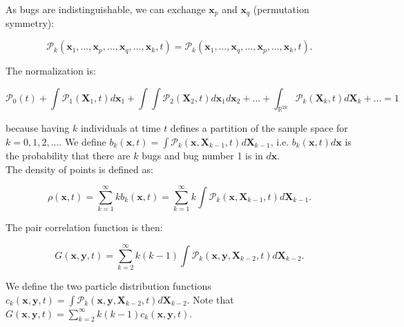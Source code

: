 As bugs are indistinguishable, we can exchange $\boldsymbol{x}_{p}$
and $\boldsymbol{x}_{q}$ (permutation symmetry):

\begin{equation}
\mathcal{P}_{k}(\boldsymbol{x}_{1},\ldots,\boldsymbol{x}_{p},\ldots,\boldsymbol{x}_{q},\ldots,\boldsymbol{x}_{k},t)=\mathcal{P}_{k}(\boldsymbol{x}_{1},\ldots,\boldsymbol{x}_{q},\ldots,\boldsymbol{x}_{p},\ldots,\boldsymbol{x}_{k},t).
\end{equation}

\vspace{1.25em}

The normalization is: 

\begin{equation}
\mathcal{P}_{0}(t)+\int\mathcal{P}_{1}(\boldsymbol{X}_{1},t)d\boldsymbol{x}_{1}+\int\int\mathcal{P}_{2}(\boldsymbol{X}_{2},t)d\boldsymbol{x}_{1}d\boldsymbol{x}_{2}+\ldots+\int_{\mathbb{R}^{2k}}\mathcal{P}_{k}(\boldsymbol{X}_{k},t)d\boldsymbol{X}_{k}+\ldots=1
\end{equation}

\vspace{1.25em}
because having $k$ individuals at time $t$ defines a partition of the sample space for $k=0,1,2,...$. 
We define $b_{k}(\boldsymbol{x},t)=\int\mathcal{P}_{k}(\boldsymbol{x},\boldsymbol{X}_{k-1},t)d\boldsymbol{X}_{k-1}$, i.e. $b_{k}(\boldsymbol{x},t)d\boldsymbol{x}$ is 
the probability that there are $k$ bugs and bug number 1 is in $d\boldsymbol{x}$.\\

The density of points is defined as:

\begin{equation}
\rho(\boldsymbol{x},t)=\sum_{k=1}^{\infty}kb_{k}(\boldsymbol{x},t)=\sum_{k=1}^{\infty}k\int\mathcal{P}_{k}(\boldsymbol{x},\boldsymbol{X}_{k-1},t)d\boldsymbol{X}_{k-1}.
\end{equation}

The pair correlation function is then:

\begin{equation}
G(\boldsymbol{x},\boldsymbol{y},t)=\sum_{k=2}^{\infty}k(k-1)\int\mathcal{P}_{k}(\boldsymbol{x},\boldsymbol{y},\boldsymbol{X}_{k-2},t)d\boldsymbol{X}_{k-2}. \label{eq:def_pairdens}
\end{equation}

We define the two particle distribution functions $c_{k}(\boldsymbol{x},\boldsymbol{y},t)=\int\mathcal{P}_{k}(\boldsymbol{x},\boldsymbol{y},\boldsymbol{X}_{k-2},t)d\boldsymbol{X}_{k-2}$. Note that $G(\boldsymbol{x},\boldsymbol{y},t)=\sum_{k=2}^{\infty}k(k-1)c_{k}(\boldsymbol{x},\boldsymbol{y},t)$.\\


